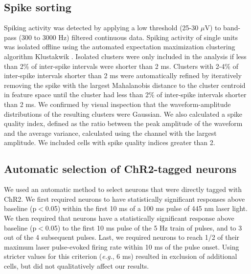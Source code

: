 \subsection{Spike sorting}
Spiking activity was detected by applying a low threshold (25-30 $\mu$V) to band-pass (300 to 3000 Hz) filtered continuous data.
%
Spiking activity of single units was isolated offline using the automated expectation maximization clustering algorithm Klustakwik \citep{Kadir2014}. 
%
Isolated clusters were only included in the analysis if less than 2\% of inter-spike intervals were shorter than 2 ms. 
%
Clusters with 2-4\% of inter-spike intervals shorter than 2 ms were automatically refined by iteratively removing the spike with the largest Mahalanobis distance to the cluster centroid in feature space until the cluster had less than 2\% of inter-spike intervals shorter than 2 ms.
%
We confirmed by visual inspection that the waveform-amplitude distributions of the resulting clusters were Gaussian.
%
We also calculated a spike quality index, defined as the ratio between the peak amplitude of the waveform and the average variance, calculated using the channel with the largest amplitude.
%
We included cells with spike quality indices greater than 2. 


\subsection{Automatic selection of ChR2-tagged neurons}
%
We used an automatic method to select neurons that were directly tagged with ChR2. 
%
We first required neurons to have statistically significant responses above baseline (p$<$0.05) within the first 10 ms of a 100 ms pulse of 445 nm laser light.
%
We then required that neurons have a statistically significant response above baseline (p$<$0.05) to the first 10 ms pulse of the 5 Hz train of pulses, and to 3 out of the 4 subsequent pulses. 
%
Last, we required neurons to reach 1/2 of their maximum laser pulse-evoked firing rate within 10 ms of the pulse onset.
%
Using stricter values for this criterion (\emph{e.g.}, 6 ms) resulted in exclusion of additional cells, but did not qualitatively affect our results.

